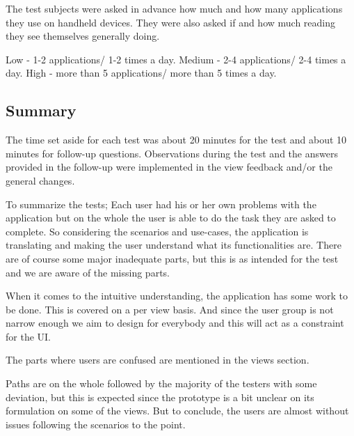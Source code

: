 The test subjects were asked in advance how much and how many applications they use on handheld devices. They were also asked if and how much reading they see themselves generally doing.\newline

Low - 1-2 applications/ 1-2 times a day.
Medium - 2-4 applications/ 2-4 times a day.
High - more than 5 applications/ more than 5 times a day.


\subsection{Summary}
The time set aside for each test was about 20 minutes for the test and about 10 minutes for follow-up questions. Observations during the test and the answers provided in the follow-up were implemented in the view feedback and/or the general changes.

To summarize the tests; Each user had his or her own problems with the application but on the whole the user is able to do the task they are asked to complete. So considering the scenarios and use-cases, the application is translating and making the user understand what its functionalities are. There are of course some major inadequate parts, but this is as intended for the test and we are aware of the missing parts.

When it comes to the intuitive understanding, the application has some work to be done. This is covered on a per view basis. And since the user group is not narrow enough we aim to design for everybody and this will act as a constraint for the UI. 

The parts where users are confused are mentioned in the views section.

Paths are on the whole followed by the majority of the testers with some deviation, but this is expected since the prototype is a bit unclear on its formulation on some of the views. But to conclude, the users are almost without issues following the scenarios to the point.

